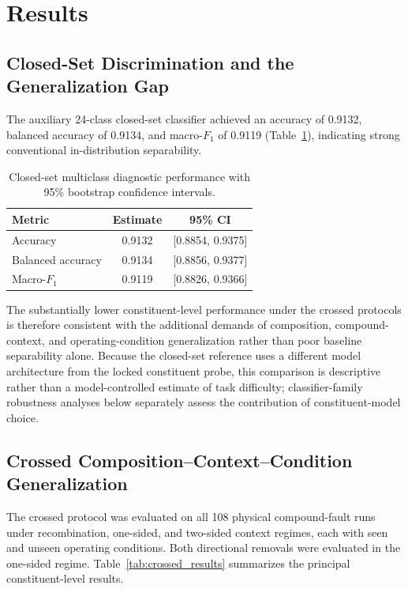 \documentclass{ieeeaccess}
\begin{document}
\section{Results}
\label{sec:results}

\subsection{Closed-Set Discrimination and the Generalization Gap}
\label{subsec:closed_set_results}

The auxiliary 24-class closed-set classifier achieved an accuracy of 0.9132,
balanced accuracy of 0.9134, and macro-$F_1$ of 0.9119
(Table~\ref{tab:closed_set_results}), indicating strong conventional
in-distribution separability.

\begin{table}[t]
\caption{Closed-set multiclass diagnostic performance with 95\% bootstrap
confidence intervals.}
\label{tab:closed_set_results}
\centering
\begin{tabular}{lcc}
\toprule
Metric & Estimate & 95\% CI \\
\midrule
Accuracy & 0.9132 & [0.8854, 0.9375] \\
Balanced accuracy & 0.9134 & [0.8856, 0.9377] \\
Macro-$F_1$ & 0.9119 & [0.8826, 0.9366] \\
\bottomrule
\end{tabular}
\end{table}

The substantially lower constituent-level performance under the crossed
protocols is therefore consistent with the additional demands of composition,
compound-context, and operating-condition generalization rather than poor
baseline separability alone. Because the closed-set reference uses a different
model architecture from the locked constituent probe, this comparison is
descriptive rather than a model-controlled estimate of task difficulty;
classifier-family robustness analyses below separately assess the contribution
of constituent-model choice.


\subsection{Crossed Composition--Context--Condition Generalization}
\label{subsec:crossed_results}

The crossed protocol was evaluated on all 108 physical compound-fault runs
under recombination, one-sided, and two-sided context regimes, each with seen
and unseen operating conditions. Both directional removals were evaluated in
the one-sided regime. Table~\ref{tab:crossed_results} summarizes the principal
constituent-level results.
\end{document}
